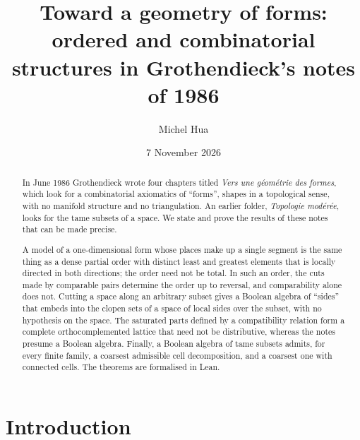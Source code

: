 \documentclass[11pt,a4paper]{amsart}
\title[Toward a geometry of forms]{Toward a geometry of forms:\\ ordered and combinatorial structures in Grothendieck's notes of 1986}
\author{Michel Hua}
\date{7 November 2026}
\theoremstyle{definition}
\theoremstyle{remark}
\begin{document}
\begin{abstract}
In June 1986 Grothendieck wrote four chapters titled \emph{Vers une géométrie des formes}, which look for a combinatorial axiomatics of ``forms'', shapes in a topological sense, with no manifold structure and no triangulation. An earlier folder, \emph{Topologie modérée}, looks for the tame subsets of a space. We state and prove the results of these notes that can be made precise.

A model of a one-dimensional form whose places make up a single segment is the same thing as a dense partial order with distinct least and greatest elements that is locally directed in both directions; the order need not be total. In such an order, the cuts made by comparable pairs determine the order up to reversal, and comparability alone does not. Cutting a space along an arbitrary subset gives a Boolean algebra of ``sides'' that embeds into the clopen sets of a space of local sides over the subset, with no hypothesis on the space. The saturated parts defined by a compatibility relation form a complete orthocomplemented lattice that need not be distributive, whereas the notes presume a Boolean algebra. Finally, a Boolean algebra of tame subsets admits, for every finite family, a coarsest admissible cell decomposition, and a coarsest one with connected cells. The theorems are formalised in Lean.
\end{abstract}

\maketitle

\section{Introduction}
\end{document}

